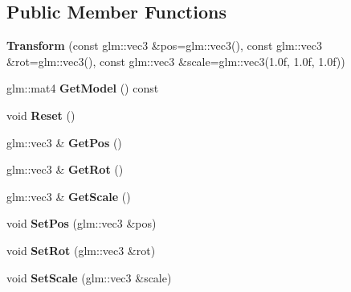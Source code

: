 \subsection*{Public Member Functions}
\begin{DoxyCompactItemize}
\item 
{\bfseries Transform} (const glm\+::vec3 \&pos=glm\+::vec3(), const glm\+::vec3 \&rot=glm\+::vec3(), const glm\+::vec3 \&scale=glm\+::vec3(1.\+0f, 1.\+0f, 1.\+0f))\hypertarget{class_transform_add035b5fd0670b28e001376e3bd0b3e4}{}\label{class_transform_add035b5fd0670b28e001376e3bd0b3e4}

\item 
glm\+::mat4 {\bfseries Get\+Model} () const \hypertarget{class_transform_a595794de4a147c89235954314f451581}{}\label{class_transform_a595794de4a147c89235954314f451581}

\item 
void {\bfseries Reset} ()\hypertarget{class_transform_a595f025127f8297ff0d159beb9c8fdd5}{}\label{class_transform_a595f025127f8297ff0d159beb9c8fdd5}

\item 
glm\+::vec3 \& {\bfseries Get\+Pos} ()\hypertarget{class_transform_aac3ae43f96c83f13326623c75939475b}{}\label{class_transform_aac3ae43f96c83f13326623c75939475b}

\item 
glm\+::vec3 \& {\bfseries Get\+Rot} ()\hypertarget{class_transform_afd30598557e0b9481d80c973d5f38966}{}\label{class_transform_afd30598557e0b9481d80c973d5f38966}

\item 
glm\+::vec3 \& {\bfseries Get\+Scale} ()\hypertarget{class_transform_ab1beb0c0174d15cd211625265c54e52c}{}\label{class_transform_ab1beb0c0174d15cd211625265c54e52c}

\item 
void {\bfseries Set\+Pos} (glm\+::vec3 \&pos)\hypertarget{class_transform_a7224aa5c71fe8c24f69503c92274c143}{}\label{class_transform_a7224aa5c71fe8c24f69503c92274c143}

\item 
void {\bfseries Set\+Rot} (glm\+::vec3 \&rot)\hypertarget{class_transform_ae90159b68dc95535b8c63eccce2a9ea1}{}\label{class_transform_ae90159b68dc95535b8c63eccce2a9ea1}

\item 
void {\bfseries Set\+Scale} (glm\+::vec3 \&scale)\hypertarget{class_transform_ae3fabfd2a2ff59c019f7ad2eefe16dae}{}\label{class_transform_ae3fabfd2a2ff59c019f7ad2eefe16dae}

\end{DoxyCompactItemize}
